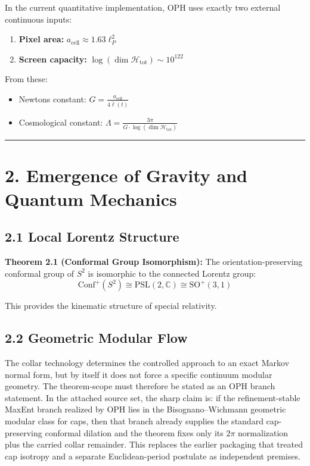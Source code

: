 In the current quantitative implementation, OPH uses exactly two external continuous inputs:

\begin{enumerate}
\def\labelenumi{\arabic{enumi}.}
\tightlist
\item
  \textbf{Pixel area:} \(a_{\text{cell}} \approx 1.63 \ell_P^2\)
\item
  \textbf{Screen capacity:} \(\log(\dim \mathcal{H}_{\text{tot}}) \sim 10^{122}\)
\end{enumerate}

From these:

\begin{itemize}
\tightlist
\item
  Newton\textquotesingle s constant: \(G = \frac{a_{\text{cell}}}{4\bar{\ell}(t)}\)
\item
  Cosmological constant: \(\Lambda = \frac{3\pi}{G \cdot \log(\dim \mathcal{H}_{\text{tot}})}\)
\end{itemize}

\begin{center}\rule{0.5\linewidth}{0.5pt}\end{center}

\section{2. Emergence of Gravity and Quantum Mechanics}\label{2-emergence-of-gravity-and-quantum-mechanics}

\subsection{2.1 Local Lorentz Structure}\label{21-local-lorentz-structure}

\textbf{Theorem 2.1 (Conformal Group Isomorphism):} The orientation-preserving conformal group of \(S^2\) is isomorphic to the connected Lorentz group: \[\text{Conf}^+(S^2) \cong \text{PSL}(2,\mathbb{C}) \cong \text{SO}^+(3,1)\]

This provides the kinematic structure of special relativity.

\subsection{2.2 Geometric Modular Flow}\label{22-geometric-modular-flow}

The collar technology determines the controlled approach to an exact Markov normal form, but by itself it does not force a specific continuum modular geometry. The theorem-scope must therefore be stated as an OPH branch statement. In the attached source set, the sharp claim is: if the refinement-stable MaxEnt branch realized by OPH lies in the Bisognano--Wichmann geometric modular class for caps, then that branch already supplies the standard cap-preserving conformal dilation and the theorem fixes only its \(2\pi\) normalization plus the carried collar remainder. This replaces the earlier packaging that treated cap isotropy and a separate Euclidean-period postulate as independent premises.

